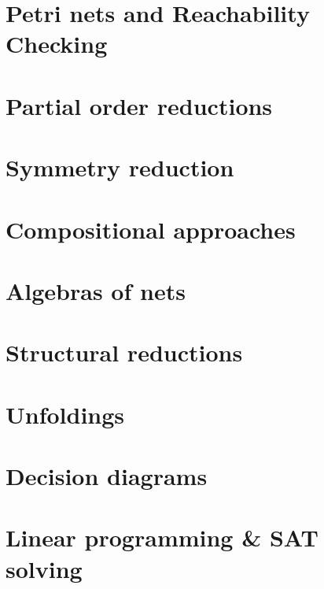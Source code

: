 \section{Petri nets and Reachability Checking}\label{sec:reachabilityChecking}

\section{Partial order reductions}\label{sec:partialOrderApproaches}

\section{Symmetry reduction}\label{sec:symmetryReduction}

\section{Compositional approaches}\label{sec:compositionalApproaches}

\section{Algebras of nets}\label{sec:algebras}

\section{Structural reductions}\label{sec:structuralReductions}

\section{Unfoldings}\label{sec:unfoldings}

\section{Decision diagrams}\label{sec:decisionDiagrams}

\section{Linear programming \& SAT solving}\label{sec:LPAndSAT}

